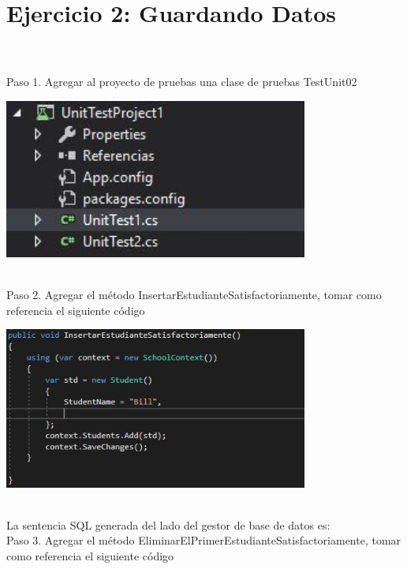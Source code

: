 \section{Ejercicio 2: Guardando Datos} 

\textbf{}\\
\textbf{}\\
Paso 1. Agregar al proyecto de pruebas una clase de pruebas TestUnit02

\begin{center}
	\includegraphics[width=10cm]{./Imagenes/Captura8} 
	\end{center}
\textbf{}\\
Paso 2. Agregar el método InsertarEstudianteSatisfactoriamente, tomar como referencia el siguiente código
\begin{center}
	\includegraphics[width=10cm]{./Imagenes/Captura9} 
	\end{center}
\textbf{}\\
La sentencia SQL generada del lado del gestor de base de datos es:
\textbf{}\\
Paso 3. Agregar el método EliminarElPrimerEstudianteSatisfactoriamente, tomar como referencia el siguiente
código

